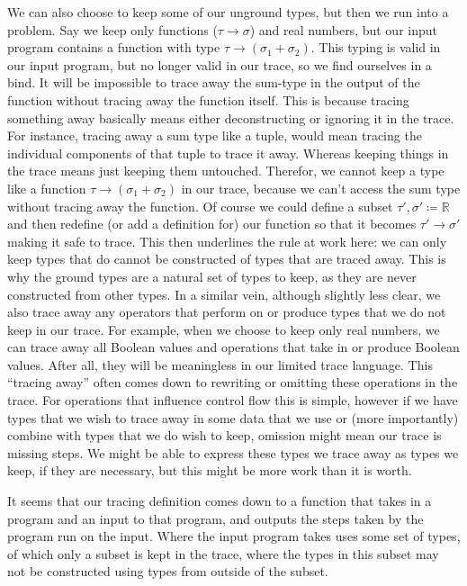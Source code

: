     We can also choose to keep some of our unground types, but then we run into a problem.
    Say we keep only functions ($\tau\to\sigma$) and real numbers, but our input program contains a function with type $\tau\to(\sigma_1+\sigma_2)$.
    This typing is valid in our input program, but no longer valid in our trace, so we find ourselves in a bind.
    It will be impossible to trace away the sum-type in the output of the function without tracing away the function itself.
    This is because tracing something away basically means either deconstructing or ignoring it in the trace.
    For instance, tracing away a sum type like a tuple, would mean tracing the individual components of that tuple to trace it away.
    Whereas keeping things in the trace means just keeping them untouched.
    Therefor, we cannot keep a type like a function $\tau\to(\sigma_1+\sigma_2)$ in our trace, because we can't access the sum type without tracing away the function.
    Of course we could define a subset $\tau',\sigma'\coloneqq\mathbb{R}$ and then redefine (or add a definition for) our function so that it becomes $\tau'\to\sigma'$ making it safe to trace.
    This then underlines the rule at work here: we can only keep types that do cannot be constructed of types that are traced away.
    This is why the ground types are a natural set of types to keep, as they are never constructed from other types.
    In a similar vein, although slightly less clear, we also trace away any operators that perform on or produce types that we do not keep in our trace.
    For example, when we choose to keep only real numbers, we can trace away all Boolean values and operations that take in or produce Boolean values.
    After all, they will be meaningless in our limited trace language.
    This ``tracing away'' often comes down to rewriting or omitting these operations in the trace.
    For operations that influence control flow this is simple, however if we have types that we wish to trace away in some data that we use or (more importantly) combine with types that we do wish to keep, omission might mean our trace is missing steps.
    We might be able to express these types we trace away as types we keep, if they are necessary, but this might be more work than it is worth.

    It seems that our tracing definition comes down to a function that takes in a program and an input to that program, and outputs the steps taken by the program run on the input.
    Where the input program takes uses some set of types, of which only a subset is kept in the trace, where the types in this subset may not be constructed using types from outside of the subset.


